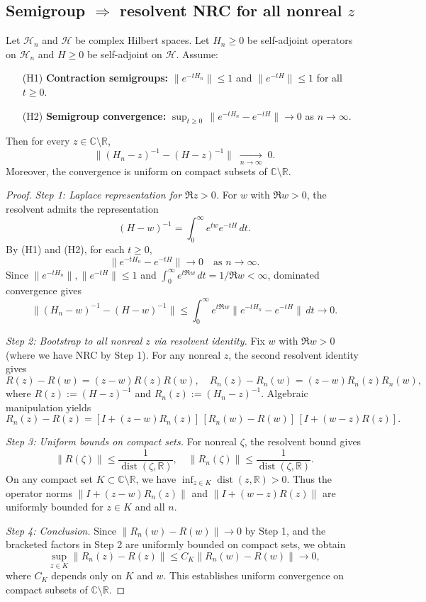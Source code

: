 \documentclass[11pt]{amsart}
\begin{document}
\subsection*{Semigroup $\Rightarrow$ resolvent NRC for all nonreal $z$}

\begin{theorem}\label{thm:NRC-allz}
Let $\mathcal{H}_n$ and $\mathcal{H}$ be complex Hilbert spaces. Let $H_n\ge 0$ be self-adjoint operators on $\mathcal{H}_n$ and $H\ge 0$ be self-adjoint on $\mathcal{H}$. Assume:
\begin{itemize}
  \item[(H1)] \textbf{Contraction semigroups:} $\|e^{-tH_n}\| \le 1$ and $\|e^{-tH}\| \le 1$ for all $t \ge 0$.
  \item[(H2)] \textbf{Semigroup convergence:} $\sup_{t\ge 0}\,\|e^{-tH_n}-e^{-tH}\|\to 0$ as $n\to\infty$.
\end{itemize}
Then for every $z\in\mathbb C\setminus\mathbb R$,
\[
  \|(H_n-z)^{-1}-(H-z)^{-1}\|\;\xrightarrow[n\to\infty]{}\;0.
\]
Moreover, the convergence is uniform on compact subsets of $\mathbb{C} \setminus \mathbb{R}$.
\end{theorem}

\begin{proof}
\emph{Step 1: Laplace representation for $\Re z > 0$.} For $w$ with $\Re w > 0$, the resolvent admits the representation
\[
  (H-w)^{-1} = \int_0^\infty e^{tw} e^{-tH}\,dt.
\]
By (H1) and (H2), for each $t \ge 0$,
\[
  \|e^{-tH_n} - e^{-tH}\| \to 0 \quad \text{as } n \to \infty.
\]
Since $\|e^{-tH_n}\|, \|e^{-tH}\| \le 1$ and $\int_0^\infty e^{t\Re w}\,dt = 1/\Re w < \infty$, dominated convergence gives
\[
  \|(H_n-w)^{-1} - (H-w)^{-1}\| \le \int_0^\infty e^{t\Re w} \|e^{-tH_n} - e^{-tH}\|\,dt \to 0.
\]

\emph{Step 2: Bootstrap to all nonreal $z$ via resolvent identity.} Fix $w$ with $\Re w > 0$ (where we have NRC by Step 1). For any nonreal $z$, the second resolvent identity gives
\[
  R(z) - R(w) = (z-w)R(z)R(w), \quad R_n(z) - R_n(w) = (z-w)R_n(z)R_n(w),
\]
where $R(z) := (H-z)^{-1}$ and $R_n(z) := (H_n-z)^{-1}$. Algebraic manipulation yields
\[
  R_n(z) - R(z) = [I + (z-w)R_n(z)]\,[R_n(w) - R(w)]\,[I + (w-z)R(z)].
\]

\emph{Step 3: Uniform bounds on compact sets.} For nonreal $\zeta$, the resolvent bound gives
\[
  \|R(\zeta)\| \le \frac{1}{\operatorname{dist}(\zeta,\mathbb{R})}, \quad \|R_n(\zeta)\| \le \frac{1}{\operatorname{dist}(\zeta,\mathbb{R})}.
\]
On any compact set $K \subset \mathbb{C} \setminus \mathbb{R}$, we have $\inf_{z \in K} \operatorname{dist}(z,\mathbb{R}) > 0$. Thus the operator norms $\|I + (z-w)R_n(z)\|$ and $\|I + (w-z)R(z)\|$ are uniformly bounded for $z \in K$ and all $n$.

\emph{Step 4: Conclusion.} Since $\|R_n(w) - R(w)\| \to 0$ by Step 1, and the bracketed factors in Step 2 are uniformly bounded on compact sets, we obtain
\[
  \sup_{z \in K} \|R_n(z) - R(z)\| \le C_K \|R_n(w) - R(w)\| \to 0,
\]
where $C_K$ depends only on $K$ and $w$. This establishes uniform convergence on compact subsets of $\mathbb{C} \setminus \mathbb{R}$.
\end{proof}
\end{document}
